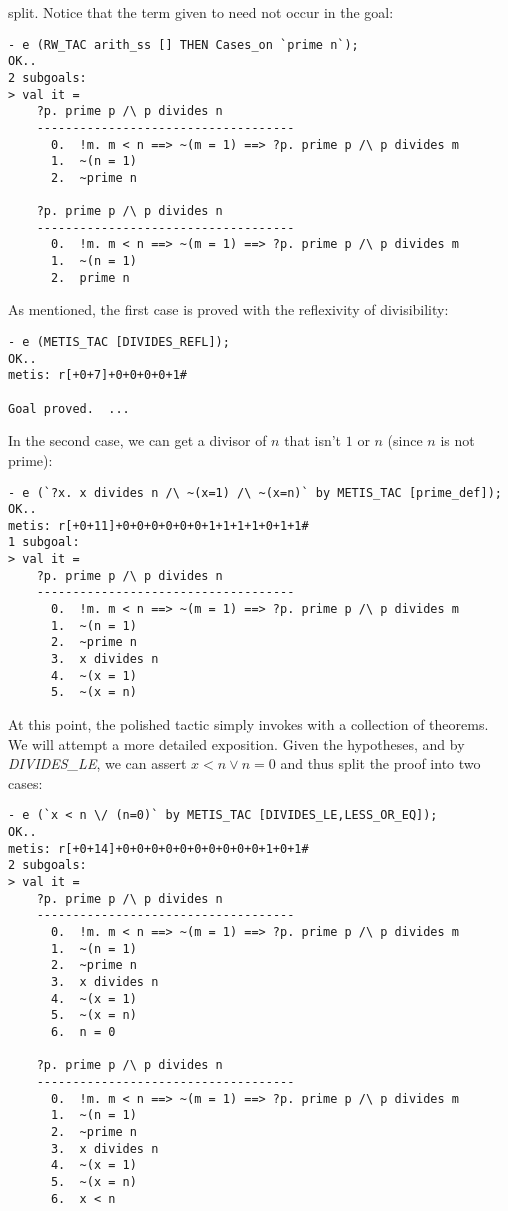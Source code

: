 split. Notice that the term given to  need not occur in
the goal:
\begin{session}
\begin{verbatim}
- e (RW_TAC arith_ss [] THEN Cases_on `prime n`);
OK..
2 subgoals:
> val it =
    ?p. prime p /\ p divides n
    ------------------------------------
      0.  !m. m < n ==> ~(m = 1) ==> ?p. prime p /\ p divides m
      1.  ~(n = 1)
      2.  ~prime n

    ?p. prime p /\ p divides n
    ------------------------------------
      0.  !m. m < n ==> ~(m = 1) ==> ?p. prime p /\ p divides m
      1.  ~(n = 1)
      2.  prime n
\end{verbatim}
\end{session}
\noindent As mentioned, the first case is proved with the reflexivity of
divisibility:
\begin{session}
\begin{verbatim}
- e (METIS_TAC [DIVIDES_REFL]);
OK..
metis: r[+0+7]+0+0+0+0+1#

Goal proved.  ...
\end{verbatim}
\end{session}
\noindent
In the second case, we can get a divisor of $n$ that isn't $1$ or $n$
(since $n$ is not prime):
\begin{session}
\begin{verbatim}
- e (`?x. x divides n /\ ~(x=1) /\ ~(x=n)` by METIS_TAC [prime_def]);
OK..
metis: r[+0+11]+0+0+0+0+0+0+1+1+1+1+0+1+1#
1 subgoal:
> val it =
    ?p. prime p /\ p divides n
    ------------------------------------
      0.  !m. m < n ==> ~(m = 1) ==> ?p. prime p /\ p divides m
      1.  ~(n = 1)
      2.  ~prime n
      3.  x divides n
      4.  ~(x = 1)
      5.  ~(x = n)
\end{verbatim}
\end{session}
At this point, the polished tactic simply invokes  with
a collection of theorems. We will attempt a more detailed
exposition. Given the hypotheses, and by {\small\it DIVIDES\_LE}, we can
assert $x < n \lor n = 0$ and thus split the proof into two cases:
\begin{session}
\begin{verbatim}
- e (`x < n \/ (n=0)` by METIS_TAC [DIVIDES_LE,LESS_OR_EQ]);
OK..
metis: r[+0+14]+0+0+0+0+0+0+0+0+0+0+1+0+1#
2 subgoals:
> val it =
    ?p. prime p /\ p divides n
    ------------------------------------
      0.  !m. m < n ==> ~(m = 1) ==> ?p. prime p /\ p divides m
      1.  ~(n = 1)
      2.  ~prime n
      3.  x divides n
      4.  ~(x = 1)
      5.  ~(x = n)
      6.  n = 0

    ?p. prime p /\ p divides n
    ------------------------------------
      0.  !m. m < n ==> ~(m = 1) ==> ?p. prime p /\ p divides m
      1.  ~(n = 1)
      2.  ~prime n
      3.  x divides n
      4.  ~(x = 1)
      5.  ~(x = n)
      6.  x < n
\end{verbatim}
\end{session}
